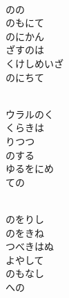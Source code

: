 \documentclass[10pt,b5j]{tarticle} %
\begin{document}
\begin{enumerate}
\begin{minipage}[c]{\blocksize}
        \vspace{\linespace}
        \item~\\
        のの\\
        のもにて\\
        のにかん\\
        ざすのは\\
        くけしめいざ\\
        のにちて
        
        \vspace{\linespace}
        \item~\\
        ウラルのく\\
        くらきは\\
        りつつ\\
        のする\\
        ゆるをにめ\\
        ての
        
        \vspace{\linespace}
        \item~\\
        のをりし\\
        のをきね\\
        つべきはぬ\\
        よやして\\
        のもなし\\
        への
    
    \end{minipage}
\end{enumerate} %
\end{document}
